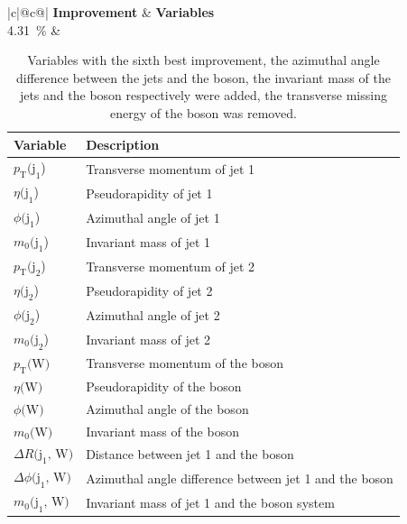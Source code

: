 \begin{table}[h]
    \centering
    \label{tab:app_vars_6}
    \caption{Variables with the sixth best improvement, the azimuthal angle difference between the jets and the \PW boson, the invariant mass of the jets and the \PW boson respectively were added, the transverse missing energy of the \PW boson was removed.}
    \begin{tabular}{ |c|@{}c@{}| }
        \hline
        \textbf{Improvement} & \textbf{Variables}\\
        \hline
        \SI{4.31}{\%} & 
        \begin{tabular}{ll}
            \hline
            Variable & Description\\
            \hline
            $p_\text{T}\text{(j}_\text{1}$) & Transverse momentum of jet 1\\
            $\eta\text{(j}_\text{1}$) & Pseudorapidity of jet 1\\
            $\phi\text{(j}_\text{1}$) & Azimuthal angle of jet 1\\
            $m_0\text{(j}_\text{1}$) & Invariant mass of jet 1\\

            $p_\text{T}\text{(j}_\text{2}$) & Transverse momentum of jet 2\\
            $\eta\text{(j}_\text{2}$) & Pseudorapidity of jet 2\\
            $\phi\text{(j}_\text{2}$) & Azimuthal angle of jet 2\\
            $m_0\text{(j}_\text{2}$) & Invariant mass of jet 2\\
            
            $p_\text{T}\text{(W)}$ & Transverse momentum of the \PW boson\\
            $\eta\text{(W)}$ & Pseudorapidity of the \PW boson\\
            $\phi\text{(W)}$ & Azimuthal angle of the \PW boson\\
            $m_0\text{(W)}$ & Invariant mass of the \PW boson\\

            $\Delta R(\text{j}_\text{1}\text{, W)}$ & Distance between jet 1 and the \PW boson\\
            $\Delta \phi\text{(j}_\text{1}\text{, W)}$ & Azimuthal angle difference between jet 1 and the \PW boson\\
            $m_0\text{(j}_\text{1}\text{, W)}$ & Invariant mass of jet 1 and the \PW boson system\\
            

\end{tabular}
\end{tabular}
\end{table}
